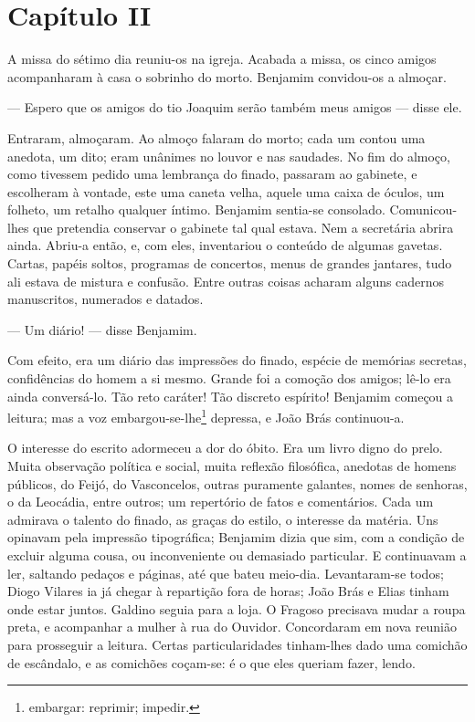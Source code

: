 \section{Capítulo II}

A missa do sétimo dia reuniu-os na igreja. Acabada a missa, os cinco
amigos acompanharam à casa o sobrinho do morto. Benjamim convidou-os a
almoçar.

--- Espero que os amigos do tio Joaquim serão também meus amigos ---
disse ele.

Entraram, almoçaram. Ao almoço falaram do morto; cada um contou uma
anedota, um dito; eram unânimes no louvor e nas saudades. No fim do
almoço, como tivessem pedido uma lembrança do finado, passaram ao
gabinete, e escolheram à vontade, este uma caneta velha, aquele uma
caixa de óculos, um folheto, um retalho qualquer íntimo. Benjamim
sentia-se consolado. Comunicou-lhes que pretendia conservar o gabinete
tal qual estava. Nem a secretária abrira ainda. Abriu-a então, e, com
eles, inventariou o conteúdo de algumas gavetas. Cartas, papéis soltos,
programas de concertos, menus de grandes jantares, tudo ali estava de
mistura e confusão. Entre outras coisas acharam alguns cadernos
manuscritos, numerados e datados.

--- Um diário! --- disse Benjamim.

Com efeito, era um diário das impressões do finado, espécie de memórias
secretas, confidências do homem a si mesmo. Grande foi a comoção dos
amigos; lê-lo era ainda conversá-lo. Tão reto caráter! Tão discreto
espírito! Benjamim começou a leitura; mas a voz
embargou-se-lhe\footnote{embargar: reprimir; impedir.} depressa, e João
Brás continuou-a.

O interesse do escrito adormeceu a dor do óbito. Era um livro digno do
prelo. Muita observação política e social, muita reflexão filosófica,
anedotas de homens públicos, do Feijó, do Vasconcelos, outras puramente
galantes, nomes de senhoras, o da Leocádia, entre outros; um repertório
de fatos e comentários. Cada um admirava o talento do finado, as graças
do estilo, o interesse da matéria. Uns opinavam pela impressão
tipográfica; Benjamim dizia que sim, com a condição de excluir alguma
cousa, ou inconveniente ou demasiado particular. E continuavam a ler,
saltando pedaços e páginas, até que bateu meio-dia. Levantaram-se todos;
Diogo Vilares ia já chegar à repartição fora de horas; João Brás e Elias
tinham onde estar juntos. Galdino seguia para a loja. O Fragoso
precisava mudar a roupa preta, e acompanhar a mulher à rua do Ouvidor.
Concordaram em nova reunião para prosseguir a leitura. Certas
particularidades tinham-lhes dado uma comichão de escândalo, e as
comichões coçam-se: é o que eles queriam fazer, lendo.

